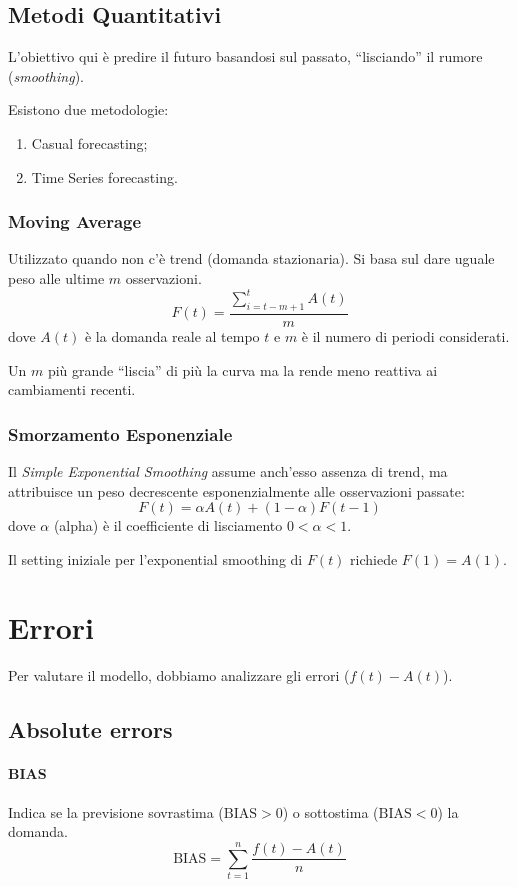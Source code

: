 %
\subsection{Metodi Quantitativi}
L'obiettivo qui è predire il futuro basandosi sul passato, ``lisciando'' il rumore (\emph{smoothing}).

Esistono due metodologie:
\begin{enumerate}
    \item Casual forecasting;
    \item Time Series forecasting.
\end{enumerate}

%
\subsubsection{Moving Average}
Utilizzato quando non c'è trend (domanda stazionaria). Si basa sul dare uguale peso alle ultime $ m $ osservazioni.
\[
    F(t) = \frac{\sum_{i=t-m+1}^{t}A(t)}{m}
\]
dove $ A(t) $ è la domanda reale al tempo $ t $ e $ m $ è il numero di periodi considerati.

\begin{note}
    Un $ m $ più grande ``liscia'' di più la curva ma la rende meno reattiva ai cambiamenti recenti.
\end{note}


%
\subsubsection{Smorzamento Esponenziale}
Il \emph{Simple Exponential Smoothing} assume anch'esso  assenza di trend, ma attribuisce un peso decrescente esponenzialmente alle osservazioni passate:
\[
    F(t) = \alpha A(t)+ (1 - \alpha) F (t-1)
\]
dove $ \alpha $ (alpha) è il coefficiente di lisciamento $ 0 < \alpha < 1 $.

Il setting iniziale per l'exponential smoothing di $ F(t) $ richiede $ F(1)=A(1) $.

%
\section{Errori}
Per valutare il modello, dobbiamo analizzare gli errori ($ f(t) - A(t) $).
%
\subsection{Absolute errors}
%
\paragraph{BIAS} Indica se la previsione sovrastima ($ \text{BIAS}>0 $) o sottostima ($ \text{BIAS}<0 $) la domanda.
\[
    \text{BIAS} = \sum_{t=1}^{n}\frac{f(t)-A(t)}{n}
\]

